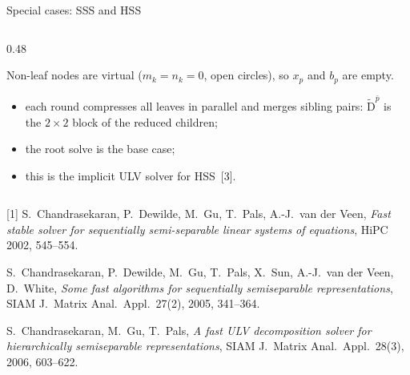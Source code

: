 \documentclass[aspectratio=169,11pt]{beamer}
\begin{document}
\begin{frame}{Special cases: SSS and HSS}
\begin{columns}[T]
\begin{column}{0.48\textwidth}
\raggedright
\scriptsize
Non-leaf nodes are virtual ($m_k=n_k=0$, open circles), so $x_p$ and $b_p$ are empty.
\begin{itemize}\setlength{\itemsep}{0pt}
\item each round compresses all leaves in parallel and merges sibling pairs: $\tilde{\mathrm{D}}^{\bar{p}}$ is the
  $2\times2$ block of the reduced children;
\item the root solve is the base case;
\item this is the implicit ULV solver for HSS~[3].
\end{itemize}
\end{column}
\end{columns}

\vfill
\raggedright
\tiny
[1] S.~Chandrasekaran, P.~Dewilde, M.~Gu, T.~Pals, A.-J.~van der Veen, \emph{Fast stable solver for sequentially semi-separable linear systems of equations}, HiPC 2002, 545--554.\par
[2] S.~Chandrasekaran, P.~Dewilde, M.~Gu, T.~Pals, X.~Sun, A.-J.~van der Veen, D.~White, \emph{Some fast algorithms for sequentially semiseparable representations}, SIAM J.\ Matrix Anal.\ Appl.\ 27(2), 2005, 341--364.\par
[3] S.~Chandrasekaran, M.~Gu, T.~Pals, \emph{A fast ULV decomposition solver for hierarchically semiseparable representations}, SIAM J.\ Matrix Anal.\ Appl.\ 28(3), 2006, 603--622.
\end{frame}
\end{document}
